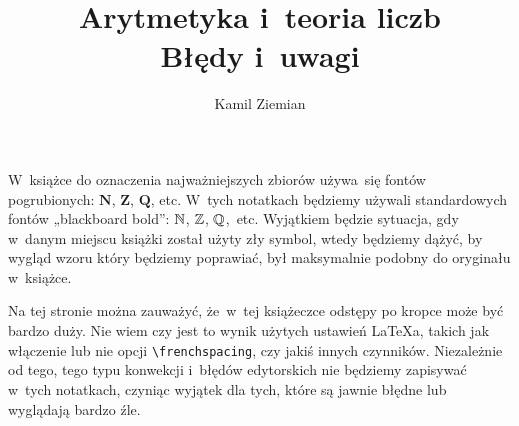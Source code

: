 \documentclass[a4paper,11pt]{article}
\title{Arytmetyka i~teoria liczb \\
  Błędy i~uwagi}
\author{Kamil Ziemian}
\begin{document}





\maketitle %






\vspace{0em}



\vspace{0em}


\noindent
W~książce do oznaczenia najważniejszych zbiorów używa~się fontów
pogrubionych: $\mathbf{N}$, $\mathbf{Z}$, $\mathbf{Q}$, etc. W~tych
notatkach będziemy używali standardowych fontów „blackboard bold”: $\mathbb{N}$,
$\mathbb{Z}$, $\mathbb{Q}$,~etc. Wyjątkiem będzie sytuacja, gdy w~danym miejscu
książki został użyty zły symbol, wtedy będziemy dążyć, by wygląd wzoru który
będziemy poprawiać, był maksymalnie podobny do oryginału w~książce.

\vspace{\spaceFour}






\vspace{0em}


 Na tej stronie można zauważyć, że~w~tej książeczce odstępy po kropce
może być bardzo duży. Nie wiem czy jest to wynik użytych ustawień \LaTeX a,
takich jak włączenie lub nie opcji \texttt{\textbackslash frenchspacing},
czy jakiś innych czynników. Niezależnie od tego, tego typu konwekcji
i~błędów edytorskich nie będziemy zapisywać w~tych notatkach, czyniąc
wyjątek dla tych, które są jawnie błędne lub wyglądają bardzo źle.

\vspace{\spaceFour}
\end{document}
